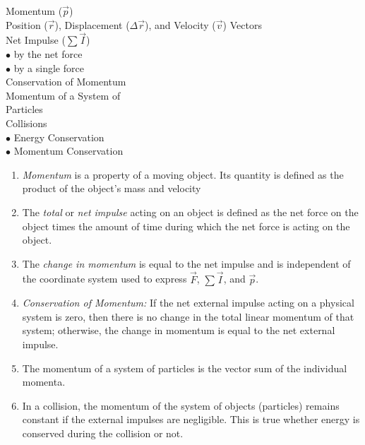 \vspace*{-\parskip}
\noindent
\parbox[c]{\leftcolumn}{
	\noindent
	Momentum ($\vec{p}$)\\

	\noindent
	Position ($\vec{r}$), Displacement ($\Delta\vec{r}$), and Velocity ($\vec{v}$) Vectors\\

	\noindent
	Net Impulse ($\sum\vec{I}$)
		\\\hspace*{1em}$\bullet$ by the net force
		\\\hspace*{1em}$\bullet$ by a single force\\
	
	\vspace{1.5cm}
	\noindent
	Conservation of Momentum\\
	
	\vspace{2cm}		
	\noindent
	Momentum of a System of\\ Particles\\
	
	\noindent
	Collisions
		\\\hspace*{1em}$\bullet$ Energy Conservation
		\\\hspace*{1em}$\bullet$ Momentum Conservation\\
	}
\parbox[c]{\rightcolumn}{
	\begin{enumerate}
		\item \emph{Momentum} is a property of a moving object. Its quantity is defined as the product of the object's mass and velocity
		
		\item The \emph{total} or \emph{net impulse} acting on an object is defined as the net force on the object times the amount of time during which the net force is acting on the object.
		
		\item The \emph{change in momentum} is equal to the net impulse and is independent of the coordinate system used to express $\vec{F}$, $\sum\vec{I}$, and $\vec{p}$.
		
		\item \emph{Conservation of Momentum:} If the net external impulse acting on a physical system is zero, then there is no change in the total linear momentum of that system; otherwise, the change in momentum is equal to the net external impulse.
		
		\item The momentum of a system of particles is the vector sum of the individual momenta.
		
		\item In a collision, the momentum of the system of objects (particles) remains constant if the external impulses are negligible. This is true whether energy is conserved during the collision or not.
	\end{enumerate}
}

\null